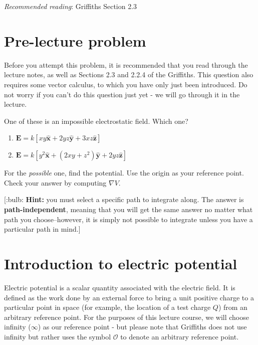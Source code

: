 \documentclass[
  letterpaper,
  DIV=11,
  numbers=noendperiod]{scrreprt}
\begin{document}
\newcommand{\a}{\mathrm{\mathbf{a}}}
\newcommand{\b}{\mathrm{\mathbf{b}}}
\newcommand{\I}{\mathrm{\mathbf{I}}}
\newcommand{\dd}{\mathrm{d}}

\emph{Recommended reading}: Griffiths Section 2.3

\section{Pre-lecture problem}\label{pre-lecture-problem-1}

Before you attempt this problem, it is recommended that you read through
the lecture notes, as well as Sections 2.3 and 2.2.4 of the Griffiths.
This question also requires some vector calculus, to which you have only
just been introduced. Do not worry if you can't do this question just
yet - we will go through it in the lecture.

One of these is an impossible electrostatic field. Which one?

\begin{enumerate}
\def\labelenumi{(\alph{enumi})}
\item
  \(\mathrm{\mathbf{E}}= k[ xy \hat{\mathrm{\mathbf{x}}} + 2yz \hat{\mathrm{\mathbf{y}}} + 3xz \hat{\mathrm{\mathbf{z}}} ]\)
\item
  \(\mathrm{\mathbf{E}}= k[ y^2 \hat{\mathrm{\mathbf{x}}} + (2xy + z^2)\hat{\mathrm{\mathbf{y}}} + 2yz \hat{\mathrm{\mathbf{z}}} ]\)
\end{enumerate}

For the \emph{possible} one, find the potential. Use the origin as your
reference point. Check your answer by computing \(\nabla V\).

{[}:bulb: \textbf{Hint:} you must select a specific path to integrate
along. The answer is \textbf{path-independent}, meaning that you will
get the same answer no matter what path you choose--however, it is
simply not possible to integrate unless you have a particular path in
mind.{]}

\section{Introduction to electric
potential}\label{introduction-to-electric-potential}

Electric potential is a scalar quantity associated with the electric
field. It is defined as the work done by an external force to bring a
unit positive charge to a particular point in space (for example, the
location of a test charge \(Q\)) from an arbitrary reference point. For
the purposes of this lecture course, we will choose infinity
(\(\infty\)) as our reference point - but please note that Griffiths
does not use infinity but rather uses the symbol \(\mathcal{O}\) to
denote an arbitrary reference point.
\end{document}

